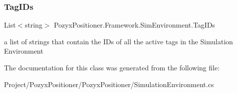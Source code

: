 \subsubsection{\texorpdfstring{Tag\+I\+Ds}{TagIDs}}
{\footnotesize\ttfamily List$<$string$>$ Pozyx\+Positioner.\+Framework.\+Sim\+Environment.\+Tag\+I\+Ds\hspace{0.3cm}{\ttfamily [get]}}



a list of strings that contain the I\+Ds of all the active tags in the Simulation Environment 



The documentation for this class was generated from the following file\+:\begin{DoxyCompactItemize}
\item 
Project/\+Pozyx\+Positioner/\+Pozyx\+Positioner/Simulation\+Environment.\+cs\end{DoxyCompactItemize}
